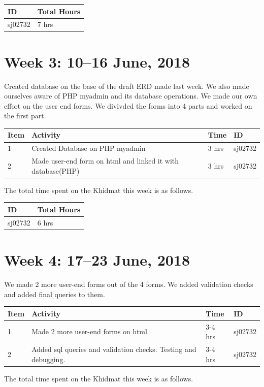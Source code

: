 \documentclass{article}
\begin{document}
\begin{tabular}{|l|l|}
  \hline
  ID & Total Hours\\\hline\hline
  sj02732 & 7 hrs\\\hline
\end{tabular}

\newpage %
\section*{Week 3: 10--16 June, 2018}

Created database on the base of the draft ERD made last week. We also made ourselves aware of PHP myadmin and its database operations. We made our own effort on the user end forms. We divivded the forms into 4 parts and worked on the first part. \newline

\begin{tabular}{|l|l|l|l|}
  \hline
  Item 	& Activity & Time & ID \\\hline\hline
  1	& Created Database on PHP myadmin & 3 hrs & sj02732 \\\hline
  2	& Made user-end form on html and linked it with database(PHP) & 3 hrs & sj02732 \\\hline
\end{tabular}
\newline
The total time spent on the Khidmat this week is as follows.

\begin{tabular}{|l|l|}
  \hline
  ID & Total Hours\\\hline\hline
  sj02732 & 6 hrs\\\hline
\end{tabular}

\newpage %
\section*{Week 4: 17--23 June, 2018}

We made 2 more user-end forms out of the 4 forms. We added validation checks and added final queries to them.  \newline

\begin{tabular}{|l|l|l|l|}
  \hline
  Item 	& Activity & Time & ID \\\hline\hline
  1	& Made 2 more user-end forms on html & 3-4 hrs & sj02732 \\\hline
  2	& Added sql queries and validation checks. Testing and debugging. & 3-4 hrs & sj02732 \\\hline
\end{tabular}
\newline
The total time spent on the Khidmat this week is as follows.
\end{document}
